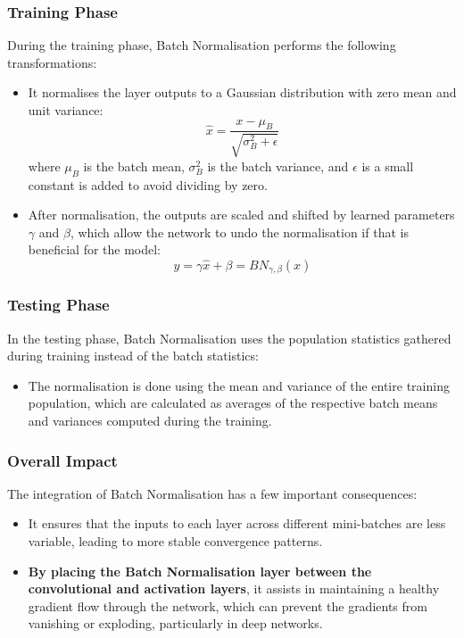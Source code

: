 \subsubsection*{Training Phase}
During the training phase, Batch Normalisation performs the following transformations:
\begin{itemize}
    \item It normalises the layer outputs to a Gaussian distribution with zero mean and unit variance:
    \begin{equation}
        \hat{x} = \frac{x - \mu_B}{\sqrt{\sigma^2_B + \epsilon}}
    \end{equation}
    where \( \mu_B \) is the batch mean, \( \sigma^2_B \) is the batch variance, and \( \epsilon \) is a small constant is added to avoid dividing by zero.
    \item After normalisation, the outputs are scaled and shifted by learned parameters \( \gamma \) and \( \beta \), which allow the network to undo the normalisation if that is beneficial for the model:
    \begin{equation}
        y = \gamma \hat{x} + \beta = BN_{\gamma,\beta}(\hat{x})
    \end{equation}
\end{itemize}

\subsubsection*{Testing Phase}
In the testing phase, Batch Normalisation uses the population statistics gathered during training instead of the batch statistics:
\begin{itemize}
    \item The normalisation is done using the mean and variance of the entire training population, which are calculated as averages of the respective batch means and variances computed during the training.
\end{itemize}

\subsubsection*{Overall Impact}
The integration of Batch Normalisation has a few important consequences:
\begin{itemize}
    \item It ensures that the inputs to each layer across different mini-batches are less variable, leading to more stable convergence patterns.
    \item \textbf{By placing the Batch Normalisation layer between the convolutional and activation layers}, it assists in maintaining a healthy gradient flow through the network, which can prevent the gradients from vanishing or exploding, particularly in deep networks.
\end{itemize}
